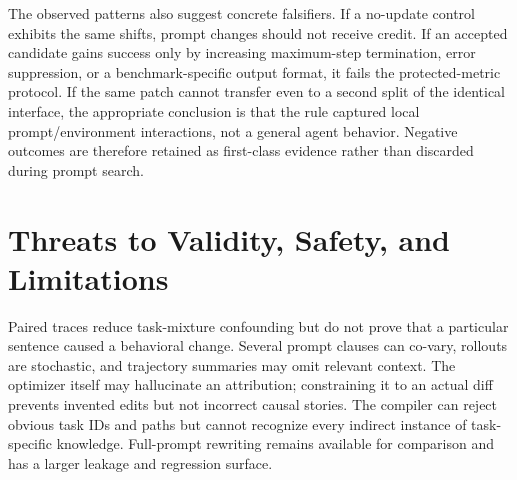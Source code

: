 \documentclass[10pt]{article}
\begin{document}
The observed patterns also suggest concrete falsifiers. If a no-update control exhibits the same shifts, prompt changes should not receive credit. If an accepted candidate gains success only by increasing maximum-step termination, error suppression, or a benchmark-specific output format, it fails the protected-metric protocol. If the same patch cannot transfer even to a second split of the identical interface, the appropriate conclusion is that the rule captured local prompt/environment interactions, not a general agent behavior. Negative outcomes are therefore retained as first-class evidence rather than discarded during prompt search.

\begin{table}[t]
\centering
\caption{Historical diagnostics, not final claims. Stage definitions and prompts predate or may differ from the current typed-patch acceptance path; they are retained to prevent selective reporting.}
\label{tab:diagnostics}
\small
{}
\end{table}

\section{Threats to Validity, Safety, and Limitations}
Paired traces reduce task-mixture confounding but do not prove that a particular sentence caused a behavioral change. Several prompt clauses can co-vary, rollouts are stochastic, and trajectory summaries may omit relevant context. The optimizer itself may hallucinate an attribution; constraining it to an actual diff prevents invented edits but not incorrect causal stories. The compiler can reject obvious task IDs and paths but cannot recognize every indirect instance of task-specific knowledge. Full-prompt rewriting remains available for comparison and has a larger leakage and regression surface.
\end{document}
